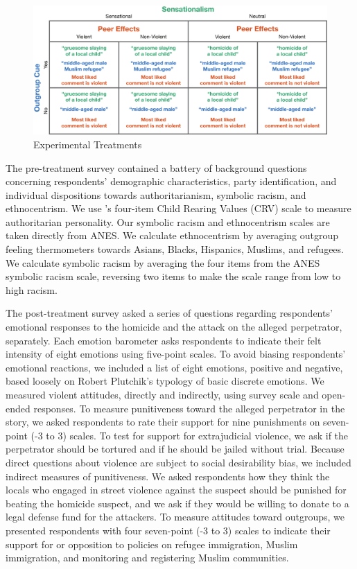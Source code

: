 \documentclass[12pt, letterpaper]{article}
\begin{document}
\begin{figure}[!htbp]
  \centering
  \caption{Experimental Treatments}
  \includegraphics[width=\textwidth]{figures/treatment_table.pdf}
\end{figure}


The pre-treatment survey contained a battery of background questions concerning respondents' demographic characteristics, party identification, and individual dispositions towards authoritarianism, symbolic racism, and ethnocentrism. We use \cite{feldman1997perceived}'s four-item Child Rearing Values (CRV) scale to measure authoritarian personality. Our symbolic racism and ethnocentrism scales are taken directly from ANES. We calculate ethnocentrism by averaging outgroup feeling thermometers towards Asians, Blacks, Hispanics, Muslims, and refugees. We calculate symbolic racism by averaging the four items from the ANES symbolic racism scale, reversing two items to make the scale range from low to high racism.

The post-treatment survey asked a series of questions regarding respondents' emotional responses to the homicide and the attack on the alleged perpetrator, separately. Each emotion barometer asks respondents to indicate their felt intensity of eight emotions using five-point scales. To avoid biasing respondents' emotional reactions, we included a list of eight emotions, positive and negative, based loosely on Robert Plutchik's typology of basic discrete emotions. We measured violent attitudes, directly and indirectly, using survey scale and open-ended responses. To measure punitiveness toward the alleged perpetrator in the story, we asked respondents to rate their support for nine punishments on seven-point (-3 to 3) scales. To test for support for extrajudicial violence, we ask if the perpetrator should be tortured and if he should be jailed without trial. Because direct questions about violence are subject to social desirability bias, we included indirect measures of punitiveness. We asked respondents how they think the locals who engaged in street violence against the suspect should be punished for beating the homicide suspect, and we ask if they would be willing to donate to a legal defense fund for the attackers. To measure attitudes toward outgroups, we presented respondents with four seven-point (-3 to 3) scales to indicate their support for or opposition to policies on refugee immigration, Muslim immigration, and monitoring and registering Muslim communities.
\end{document}
